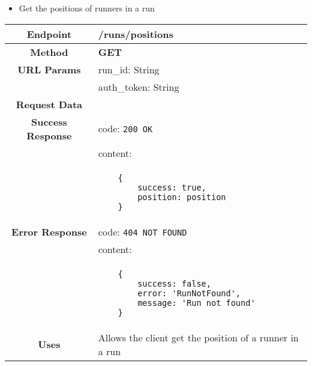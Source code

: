     
    \begin{itemize}
            \item Get the positions of runners in a run
        \end{itemize}
        \begin{adjustwidth}{1cm}{}
            \begin{longtable}{|c|l|}
                \hline
                \textbf{Endpoint} & /runs/positions \\
                \hline
                \textbf{Method} & \textbf{GET} \\
                \hline
                \textbf{URL Params} &  run\_id: String \\
                &                      auth\_token: String \\
                \hline
                \textbf{Request Data} & \\
                \hline
                \textbf{Success Response} & code: \texttt{200 OK} \\
                &                           content: \\
                & \begin{minipage}[t]{0.5\textwidth}
                    \begin{adjustwidth}{1.5cm}{}
                    \begin{verbatim}
    {
        success: true, 
        position: position
    }
                    \end{verbatim}
                    \end{adjustwidth}
                  \end{minipage} \\
                  \hline
                \textbf{Error Response} & code: \texttt{404 NOT FOUND} \\
                &                         content: \\
                & \begin{minipage}[t]{0.7\textwidth}
                    \begin{adjustwidth}{1.5cm}{}
                    \begin{verbatim}
    {
        success: false, 
        error: 'RunNotFound',
        message: 'Run not found'
    }
                    \end{verbatim}
                    \end{adjustwidth}
                  \end{minipage} \\
                  \hline
                \textbf{Uses} & Allows the client get the position of a runner in a run \\
                \hline
            \end{longtable}
        \end{adjustwidth}
    
